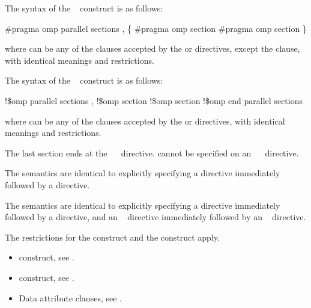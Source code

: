 \syntax
\ccppspecificstart
The syntax of the ~ construct is as follows:

\begin{boxedcode}
\#pragma omp parallel sections \plc{[clause[ [},\plc{] clause] ... ] new-line}
    \{
    \plc{[}\#pragma omp section \plc{new-line]}
    \plc{[}\#pragma omp section 
        \plc{structured-block]}
    \}
\end{boxedcode}

where  can be any of the clauses accepted by the  or  
directives, except the  clause, with identical meanings and restrictions.
\ccppspecificend

\fortranspecificstart
The syntax of the ~ construct is as follows:

\begin{boxedcode}
!\$omp parallel sections \plc{[clause[ [},\plc{] clause] ... ]}
    \plc{[}!\$omp section\plc{]}
    \plc{[}!\$omp section 
        \plc{structured-block]}
!\$omp end parallel sections
\end{boxedcode}

where  can be any of the clauses accepted by the  or  
directives, with identical meanings and restrictions. 

The last section ends at the ~~ directive.  cannot be 
specified on an ~~ directive.
\fortranspecificend

\descr
\ccppspecificstart
The semantics are identical to explicitly specifying a  directive immediately 
followed by a  directive.
\ccppspecificend

\fortranspecificstart
The semantics are identical to explicitly specifying a  directive immediately 
followed by a  directive, and an ~ directive immediately 
followed by an ~ directive. 
\fortranspecificend

\restrictions
The restrictions for the  construct and the  construct apply.

\crossreferences
\begin{itemize}
\item {} construct, see 
. 

\item {} construct, see 
.

\item Data attribute clauses, see 
.
\end{itemize}









